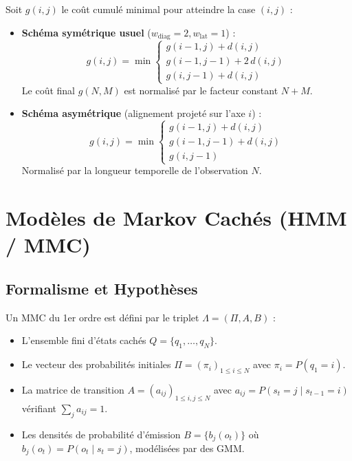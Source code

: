 \begin{prop}
    Soit $g(i,j)$ le coût cumulé minimal pour atteindre la case $(i,j)$ :
    \begin{itemize}
        \item \textbf{Schéma symétrique usuel} ($w_{\text{diag}} = 2, w_{\text{lat}} = 1$) :
            \begin{equation}
                g(i,j) = \min \begin{cases} g(i-1, j) + d(i,j) \\ g(i-1, j-1) + 2 \, d(i,j) \\ g(i, j-1) + d(i,j) \end{cases}
            \end{equation}
            Le coût final $g(N,M)$ est normalisé par le facteur constant $N+M$.
        \item \textbf{Schéma asymétrique} (alignement projeté sur l'axe $i$) :
            \begin{equation}
                g(i,j) = \min \begin{cases} g(i-1, j) + d(i,j) \\ g(i-1, j-1) + d(i,j) \\ g(i, j-1) \end{cases}
            \end{equation}
            Normalisé par la longueur temporelle de l'observation $N$.
    \end{itemize}
\end{prop}


\section{Modèles de Markov Cachés (HMM / MMC)}

\subsection{Formalisme et Hypothèses}

Un MMC du 1er ordre est défini par le triplet $\Lambda = (\Pi, A, B)$ :
\begin{itemize}
    \item L'ensemble fini d'états cachés $Q = \{q_1, \dots, q_N\}$.
    \item Le vecteur des probabilités initiales $\Pi = (\pi_i)_{1 \leqslant i \leqslant N}$ avec $\pi_i = P(q_1 = i)$.
    \item La matrice de transition $A = (a_{ij})_{1 \leqslant i,j \leqslant N}$ avec $a_{ij} = P(s_t = j \mid s_{t-1} = i)$ vérifiant $\sum_j a_{ij} = 1$.
    \item Les densités de probabilité d'émission $B = \{b_j(o_t)\}$ où $b_j(o_t) = P(o_t \mid s_t = j)$, modélisées par des GMM.
\end{itemize}

